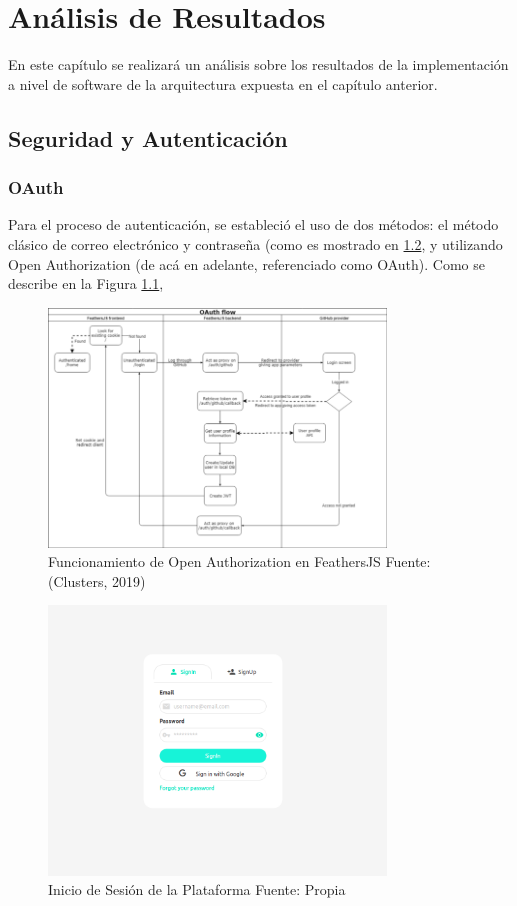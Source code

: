 \chapter{Análisis de Resultados}

En este capítulo se realizará un análisis sobre los resultados de la implementación a nivel de software de la arquitectura expuesta en el capítulo anterior.

\section{Seguridad y Autenticación}

\subsection{OAuth}

Para el proceso de autenticación, se estableció el uso de dos métodos: el método clásico de correo electrónico y contraseña (como es mostrado en \ref{figure:login}, y utilizando Open Authorization (de acá en adelante, referenciado como OAuth). Como se describe en la Figura \ref{figure:oAuth},

\begin{figure}[H]
\centering
\includegraphics[width=0.80\textwidth]{img/14.png}
\caption{
Funcionamiento de Open Authorization en FeathersJS
Fuente: (Clusters, 2019)}
\label{figure:oAuth}
\end{figure}

\begin{figure}[H]
\centering
\includegraphics[width=0.80\textwidth]{img/15.png}
\caption{
Inicio de Sesión de la Plataforma
Fuente: Propia}
\label{figure:login}
\end{figure}

